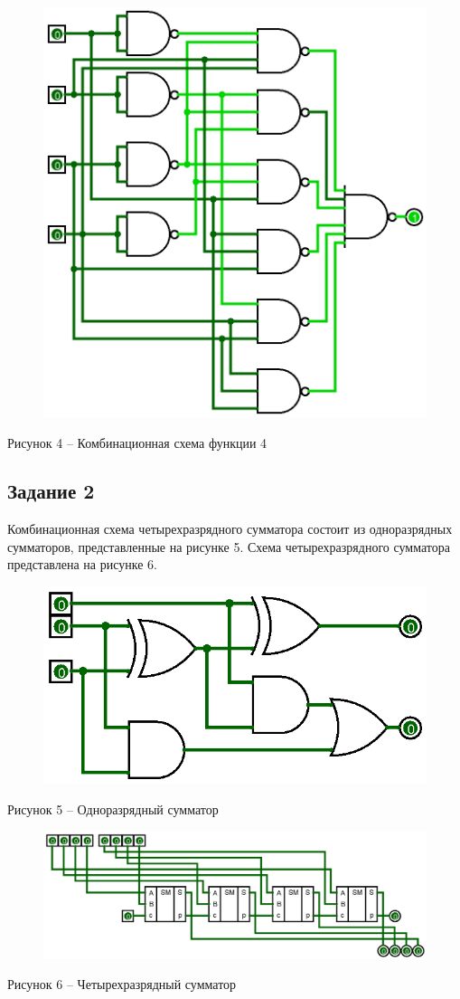 \documentclass[a4paper,14pt]{extarticle}
\begin{document}
  \begin{figure}[h]
    \centering
    \includegraphics[width=0.5\linewidth]{images/s-1-4}
  \end{figure}
  \begin{center}
    Рисунок 4 – Комбинационная схема функции 4
  \end{center}
  
  \newpage
  \subsection*{Задание 2}
  Комбинационная схема четырехразрядного сумматора состоит из одноразрядных сумматоров, представленные на рисунке 5. Схема четырехразрядного сумматора представлена на рисунке 6.
  
  \begin{figure}[h]
    \centering
    \includegraphics[width=0.5\linewidth]{images/s-2-1}
  \end{figure}
  \begin{center}
    Рисунок 5 – Одноразрядный сумматор
  \end{center}
  
  \begin{figure}[h]
    \centering
    \includegraphics[width=1\linewidth]{images/s-2-2}
  \end{figure}
  \begin{center}
    Рисунок 6 – Четырехразрядный сумматор
  \end{center}
  
\end{document}
